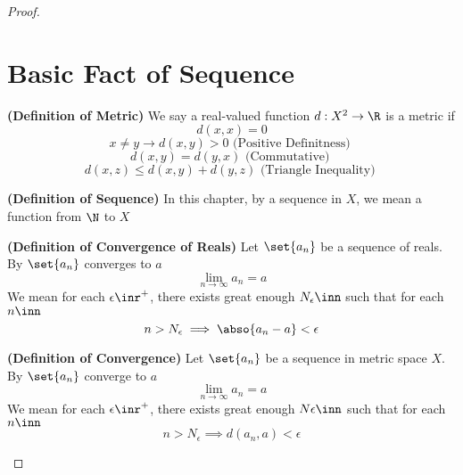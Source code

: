 \documentclass{report}
\begin{document}
\begin{proof}
\section{Basic Fact of Sequence}
\begin{definition}
\label{3.1.1}
\textbf{(Definition of Metric)} We say a real-valued function $d:X^2\rightarrow \R$ is a metric if
\begin{equation}
d(x,x)=0 
\end{equation}
\begin{equation}
x\neq y\longrightarrow d(x,y)>0\text{ (Positive Definitness) }
\end{equation}
\begin{equation}
d(x,y)=d(y,x)\text{ (Commutative) }
\end{equation}
\begin{equation}
d(x,z)\leq d(x,y)+d(y,z)\text{ (Triangle Inequality) }
\end{equation}
\end{definition}
\begin{definition}
\label{3.1.2}
\textbf{(Definition of Sequence)} In this chapter, by a sequence in $X$, we mean a function from  $\N$ to  $X$
\end{definition}
\begin{definition}
\label{3.1.3}
\textbf{(Definition of Convergence of Reals)} Let $\set{a_n}$ be a sequence of reals. By $\set{a_n}$ converges to $a$ 
\begin{equation}
\lim_{n\to\infty} a_n=a
\end{equation}
We mean for each $\epsilon \inr^+$, there exists great enough $N_\epsilon \inn$  such that for each $n\inn$ 
\begin{equation}
n>N_\epsilon \implies \abso{a_n-a}<\epsilon 
\end{equation}
\end{definition}
\begin{definition}
\label{3.1.4}
\textbf{(Definition of Convergence)} Let $\set{a_n}$ be a sequence in metric space $X$. By $\set{a_n}$ converge to $a$
\begin{equation}
\lim_{n\to\infty}a_n=a
\end{equation}
We mean for each $\epsilon \inr^+$, there exists great enough $N\epsilon \inn$ such that for each $n\inn$
 \begin{equation}
n>N_\epsilon \implies d(a_n,a)<\epsilon 

\end{equation}
\end{definition}
\end{proof}
\end{document}

